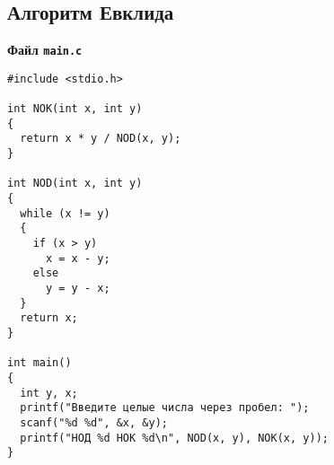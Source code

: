 \documentclass[a4paper,12pt]{extarticle}
\begin{document}
\subsection{Алгоритм Евклида}\label{code:evclid}
\centerline{\textbf{Файл \texttt{main.c}}}
\begin{verbatim}
#include <stdio.h>

int NOK(int x, int y)
{
  return x * y / NOD(x, y);
}

int NOD(int x, int y)
{
  while (x != y)
  {
    if (x > y)
      x = x - y;
    else
      y = y - x;
  }
  return x;
}

int main()
{
  int y, x;
  printf("Введите целые числа через пробел: ");
  scanf("%d %d", &x, &y);
  printf("НОД %d НОК %d\n", NOD(x, y), NOK(x, y));
}
\end{verbatim}
\hrulefill
\end{document}
